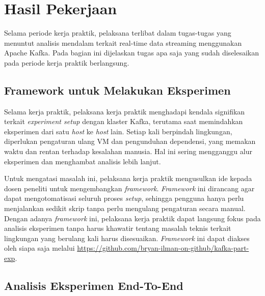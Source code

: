 \section{Hasil Pekerjaan}

Selama periode kerja praktik, pelaksana terlibat dalam tugas-tugas yang menuntut analisis mendalam terkait {real-time data streaming} menggunakan Apache Kafka. Pada bagian ini dijelaskan tugas apa saja yang sudah diselesaikan pada periode kerja praktik berlangsung.

\subsection{Framework untuk Melakukan Eksperimen}

Selama kerja praktik, pelaksana kerja praktik menghadapi kendala signifikan terkait \textit{experiment setup} dengan klaster Kafka, terutama saat memindahkan eksperimen dari satu \textit{host} ke \textit{host} lain. Setiap kali berpindah lingkungan, diperlukan pengaturan ulang VM dan pengunduhan dependensi, yang memakan waktu dan rentan terhadap kesalahan manusia. Hal ini sering mengganggu alur eksperimen dan menghambat analisis lebih lanjut.

Untuk mengatasi masalah ini, pelaksana kerja praktik mengusulkan ide kepada dosen peneliti untuk mengembangkan \textit{framework}. \textit{Framework} ini dirancang agar dapat mengotomatisasi seluruh proses \textit{setup}, sehingga pengguna hanya perlu menjalankan sedikit skrip tanpa perlu mengulang pengaturan secara manual. Dengan adanya \textit{framework} ini, pelaksana kerja praktik dapat langsung fokus pada analisis eksperimen tanpa harus khawatir tentang masalah teknis terkait lingkungan yang berulang kali harus disesuaikan. \textit{Framework} ini dapat diakses oleh siapa saja melalui \href{https://github.com/bryan-ilman-on-github/kafka-part-exp}{https://github.com/bryan-ilman-on-github/kafka-part-exp}.

\subsection{Analisis Eksperimen End-To-End}


